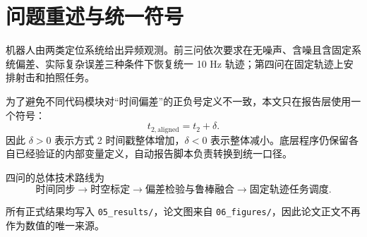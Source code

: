 \section{问题重述与统一符号}

机器人由两类定位系统给出异频观测。前三问依次要求在无噪声、含噪且含固定系统偏差、实际复杂误差三种条件下恢复统一 10 Hz 轨迹；第四问在固定轨迹上安排射击和拍照任务。

为了避免不同代码模块对“时间偏差”的正负号定义不一致，本文只在报告层使用一个符号：
\begin{equation}
  t_{2,\mathrm{aligned}}=t_2+\delta.
\end{equation}
因此 $\delta>0$ 表示方式 2 时间戳整体增加，$\delta<0$ 表示整体减小。底层程序仍保留各自已经验证的内部变量定义，自动报告脚本负责转换到统一口径。



四问的总体技术路线为
\[
\text{时间同步}
\longrightarrow
\text{时空标定}
\longrightarrow
\text{偏差检验与鲁棒融合}
\longrightarrow
\text{固定轨迹任务调度}.
\]

所有正式结果均写入 \texttt{05\_results/}，论文图来自 \texttt{06\_figures/}，因此论文正文不再作为数值的唯一来源。
